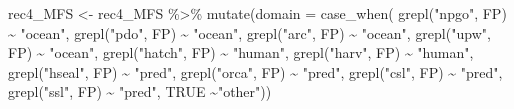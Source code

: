 \documentclass[
]{article}
\newenvironment{Shaded}{\begin{snugshade}}{\end{snugshade}}
\newcommand{\AttributeTok}[1]{\textcolor[rgb]{0.77,0.63,0.00}{#1}}
\newcommand{\ConstantTok}[1]{\textcolor[rgb]{0.00,0.00,0.00}{#1}}
\newcommand{\FunctionTok}[1]{\textcolor[rgb]{0.00,0.00,0.00}{#1}}
\newcommand{\NormalTok}[1]{#1}
\newcommand{\OtherTok}[1]{\textcolor[rgb]{0.56,0.35,0.01}{#1}}
\newcommand{\SpecialCharTok}[1]{\textcolor[rgb]{0.00,0.00,0.00}{#1}}
\newcommand{\StringTok}[1]{\textcolor[rgb]{0.31,0.60,0.02}{#1}}
\begin{document}
\begin{Shaded}
\begin{Highlighting}[]
\NormalTok{rec4\_MFS }\OtherTok{\textless{}{-}}\NormalTok{  rec4\_MFS }\SpecialCharTok{\%\textgreater{}\%} 
  \FunctionTok{mutate}\NormalTok{(}\AttributeTok{domain =} \FunctionTok{case\_when}\NormalTok{(}
    \FunctionTok{grepl}\NormalTok{(}\StringTok{"npgo"}\NormalTok{, FP) }\SpecialCharTok{\textasciitilde{}} \StringTok{"ocean"}\NormalTok{,}
    \FunctionTok{grepl}\NormalTok{(}\StringTok{"pdo"}\NormalTok{, FP) }\SpecialCharTok{\textasciitilde{}} \StringTok{"ocean"}\NormalTok{,}
    \FunctionTok{grepl}\NormalTok{(}\StringTok{"arc"}\NormalTok{, FP) }\SpecialCharTok{\textasciitilde{}} \StringTok{"ocean"}\NormalTok{,}
    \FunctionTok{grepl}\NormalTok{(}\StringTok{"upw"}\NormalTok{, FP) }\SpecialCharTok{\textasciitilde{}} \StringTok{"ocean"}\NormalTok{, }
    \FunctionTok{grepl}\NormalTok{(}\StringTok{"hatch"}\NormalTok{, FP) }\SpecialCharTok{\textasciitilde{}} \StringTok{"human"}\NormalTok{,}
    \FunctionTok{grepl}\NormalTok{(}\StringTok{"harv"}\NormalTok{, FP) }\SpecialCharTok{\textasciitilde{}} \StringTok{"human"}\NormalTok{,}
    \FunctionTok{grepl}\NormalTok{(}\StringTok{"hseal"}\NormalTok{, FP) }\SpecialCharTok{\textasciitilde{}} \StringTok{"pred"}\NormalTok{,}
    \FunctionTok{grepl}\NormalTok{(}\StringTok{"orca"}\NormalTok{, FP) }\SpecialCharTok{\textasciitilde{}} \StringTok{"pred"}\NormalTok{,}
    \FunctionTok{grepl}\NormalTok{(}\StringTok{"csl"}\NormalTok{, FP) }\SpecialCharTok{\textasciitilde{}} \StringTok{"pred"}\NormalTok{, }
    \FunctionTok{grepl}\NormalTok{(}\StringTok{"ssl"}\NormalTok{, FP) }\SpecialCharTok{\textasciitilde{}} \StringTok{"pred"}\NormalTok{, }
    \ConstantTok{TRUE} \SpecialCharTok{\textasciitilde{}}\StringTok{"other"}\NormalTok{))}


\end{Highlighting}
\end{Shaded}
\end{document}
